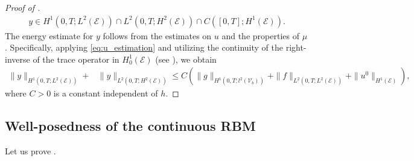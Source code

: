 \documentclass[a4paper, 10pt, english]{article}
\begin{document}
\begin{proof}[Proof of ]
\begin{align*}
        y \in H^1(0,T; L^2(\mathcal{E})) \cap L^2(0,T; H^2(\mathcal{E})) \cap C([0,T]; H^1(\mathcal{E})).
    \end{align*}
    The energy estimate for $y$ follows from the estimates on $u$ and the properties of $\mu$. Specifically, applying \eqref{eq:u_estimation} and utilizing the continuity of the right-inverse of the trace operator in $H_0^1(\mathcal{E})$ (see \cite[Chapter I, Theorem 8.3]{lions_book}), we obtain
    \begin{align*}
        \|y\|_{H^1(0,T; L^2(\mathcal{E}))} +&\|y\|_{L^2(0,T; H^2(\mathcal{E}))}\leq C \left( \|g\|_{H^1(0,T; l^2(\mathcal{V}_b))} + \|f\|_{L^2(0,T; L^2(\mathcal{E}))} + \|u^0\|_{H^1(\mathcal{E})} \right),
    \end{align*}
    where $C > 0$ is a constant independent of $h$.
\end{proof}


 \subsection{Well-posedness of the continuous RBM}\label{sec:well-posed-random}

Let us prove .
\end{document}

